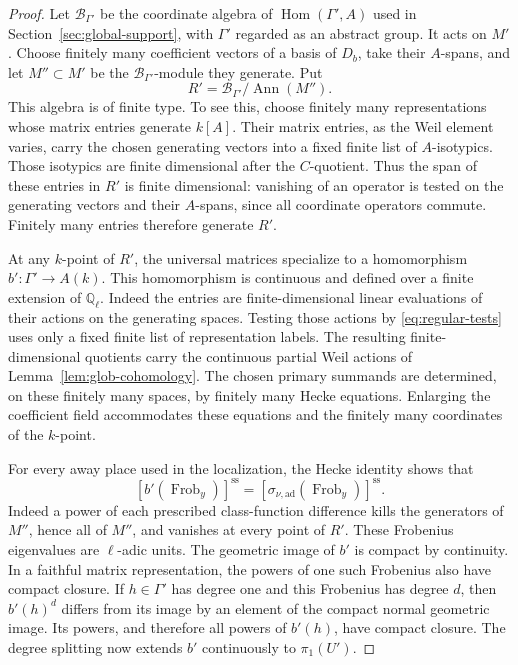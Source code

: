 \documentclass[11pt]{article}
\numberwithin{equation}{section}
\theoremstyle{definition}
\theoremstyle{remark}
\newcommand{\Q}{\mathbb Q}
\newcommand{\Frob}{\operatorname{Frob}}
\newcommand{\Hom}{\operatorname{Hom}}
\begin{document}
\begin{proof}
Let $\mathscr B_{\Gamma'}$ be the coordinate algebra of
$\Hom(\Gamma',A)$ used in Section~\ref{sec:global-support}, with
$\Gamma'$ regarded as an abstract group.  It acts on $M'$.  Choose
finitely many coefficient vectors of a basis of $D_b$, take their
$A$-spans, and let $M''\subset M'$ be the
$\mathscr B_{\Gamma'}$-module they generate.  Put
\[
 R'=\mathscr B_{\Gamma'}/\operatorname{Ann}(M'').
\]
This algebra is of finite type.  To see this, choose finitely many
representations whose matrix entries generate $k[A]$.  Their matrix
entries, as the Weil element varies, carry the chosen generating
vectors into a fixed finite list of $A$-isotypics.  Those isotypics are
finite dimensional after the $C$-quotient.  Thus the span of these
entries in $R'$ is finite dimensional: vanishing of an operator is
tested on the generating vectors and their $A$-spans, since all
coordinate operators commute.  Finitely many entries therefore
generate $R'$.

At any $k$-point of $R'$, the universal matrices specialize to a
homomorphism $b':\Gamma'\to A(k)$.  This homomorphism is continuous and
defined over a finite extension of $\Q_\ell$.  Indeed the entries are
finite-dimensional linear evaluations of their actions on the
generating spaces.  Testing those actions by
\eqref{eq:regular-tests} uses only a fixed finite list of representation
labels.  The resulting finite-dimensional quotients carry the
continuous partial Weil actions of Lemma~\ref{lem:glob-cohomology}.
The chosen primary summands are determined, on these finitely many
spaces, by finitely many Hecke equations.  Enlarging the coefficient
field accommodates these equations and the finitely many coordinates
of the $k$-point.

For every away place used in the localization, the Hecke identity
shows that
\[
 [b'(\Frob_y)]^{\mathrm{ss}}
   =[\sigma_{\nu,\mathrm{ad}}(\Frob_y)]^{\mathrm{ss}}.
\]
Indeed a power of each prescribed class-function difference kills the
generators of $M''$, hence all of $M''$, and vanishes at every point
of $R'$.  These Frobenius eigenvalues are $\ell$-adic units.  The
geometric image of $b'$ is compact by continuity.  In a faithful
matrix representation, the powers of one such Frobenius also have
compact closure.  If $h\in\Gamma'$ has degree one and this Frobenius
has degree $d$, then $b'(h)^d$ differs from its image by an element of
the compact normal geometric image.  Its powers, and therefore all
powers of $b'(h)$, have compact closure.  The degree splitting now
extends $b'$ continuously to $\pi_1(U')$.


\end{proof}
\end{document}
